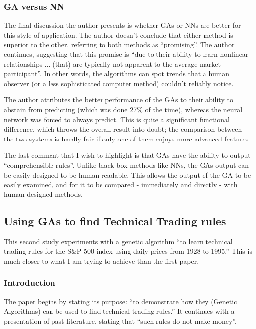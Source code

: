 \subsubsection{GA versus NN}

The final discussion the author presents is whether GAs or NNs are better for this style of application. The author doesn't conclude that either method is superior to the other, referring to both methods as ``promising''. The author continues, suggesting that this promise is ``due to their ability to learn nonlinear relationships ... (that) are typically not apparent to the average market participant''. In other words, the algorithms can spot trends that a human observer (or a less sophisticated computer method) couldn't reliably notice. \newline

The author attributes the better performance of the GAs to their ability to abstain from predicting (which was done 27\% of the time), whereas the neural network was forced to always predict. This is quite a significant functional difference, which throws the overall result into doubt; the comparison between the two systems is hardly fair if only one of them enjoys more advanced features. \newline

The last comment that I wish to highlight is that GAs have the ability to output ``comprehensible rules''. Unlike black box methods like NNs, the GAs output can be easily designed to be human readable. This allows the output of the GA to be easily examined, and for it to be compared - immediately and directly - with human designed methods.

\subsection{Using GAs to find Technical Trading rules \cite{allenKarjalainen}}
This second study experiments with a genetic algorithm ``to learn technical trading rules for the S\&P 500 index using daily prices from 1928 to 1995.'' This is much closer to what I am trying to achieve than the first paper.

\subsubsection{Introduction}
The paper begins by stating its purpose: ``to demonstrate how they (Genetic Algorithms) can be used to find technical trading rules.'' It continues with a presentation of past literature, stating that ``such rules do not make money''. \newline


